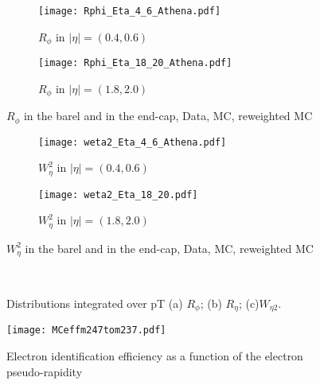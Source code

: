       \begin{figure}[htbp]
  	\begin{subfigure}[t]{0.5\textwidth}
  		\texttt{[image: Rphi\_Eta\_4\_6\_Athena.pdf]}
  		\caption{$R_{\phi}$ in $|\eta| = (0.4,0.6)$ }
  		\label{fig::rphi_rew_04}
  	\end{subfigure}
  	\hfill
  	\begin{subfigure}[t]{0.5\textwidth} 
  		\texttt{[image: Rphi\_Eta\_18\_20\_Athena.pdf]}
  		\caption{$R_{\phi}$ in $|\eta| = (1.8,2.0)$ }
  		\label{fig::rphi_rew_18}
  	\end{subfigure}
  	\caption{$R_{\phi}$ in the barel and in the end-cap, Data, MC, reweighted MC}
  	\label{fig::rphi_rew}
  \end{figure}
  
    \begin{figure}[htbp]
	\begin{subfigure}[t]{0.5\textwidth}
		\texttt{[image: weta2\_Eta\_4\_6\_Athena.pdf]}
		\caption{$W_{\eta}^2$ in $|\eta| = (0.4,0.6)$ }
		\label{fig::weta2_rew_04}
	\end{subfigure}
	\hfill
	\begin{subfigure}[t]{0.5\textwidth} 
		\texttt{[image: weta2\_Eta\_18\_20.pdf]}
		\caption{$W_{\eta}^2$ in $|\eta| = (1.8,2.0)$ }
		\label{fig::weta2_rew_18}
	\end{subfigure}
	\caption{$W_{\eta}^2$ in the barel and in the end-cap, Data, MC, reweighted MC}
	\label{fig::weta2_rew}
\end{figure}

\begin{figure*}[ht!]
	\quad
	\quad
	\\

	\caption{ 	\label{fig::integrated} Distributions integrated over pT (a) $R_{\phi}$; (b) $R_{\eta}$; (c)$W_{\eta 2}$.}
\end{figure*}


  
  \begin{figure}[htbp]
  	\centering
  	\texttt{[image: MCeffm247tom237.pdf]}\\
  	\caption{Electron identification efficiency as a function of the electron pseudo-rapidity}
  	\label{SF}
  \end{figure}
